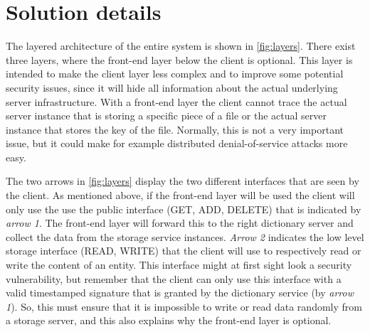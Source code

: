 \documentclass[12pt,a4paper]{scrartcl}
\begin{document}
\section{Solution details}
The layered architecture of the entire system is shown in \autoref{fig:layers}. There exist three layers, where the front-end layer below the client is optional. This layer is intended to make the client layer less complex and to improve some potential security issues, since it will hide all information about the actual underlying server infrastructure. With a front-end layer the client cannot trace the actual server instance that is storing a specific piece of a file or the actual server instance that stores the key of the file. Normally, this is not a very important issue, but it could make for example distributed denial-of-service attacks more easy.

The two arrows in \autoref{fig:layers} display the two different interfaces that are seen by the client. As mentioned above, if the front-end layer will be used the client will only use the use the public interface (GET, ADD, DELETE) that is indicated by \emph{arrow 1}. The front-end layer will forward this to the right dictionary server and collect the data from the storage service instances. \emph{Arrow 2} indicates the low level storage interface (READ, WRITE) that the client will use to respectively read or write the content of an entity. This interface might at first sight look a security vulnerability, but remember that the client can only use this interface with a valid timestamped signature that is granted by the dictionary service (by \emph{arrow 1}). So, this must ensure that it is impossible to write or read data randomly from a storage server, and this also explains why the front-end layer is optional.
\end{document}
